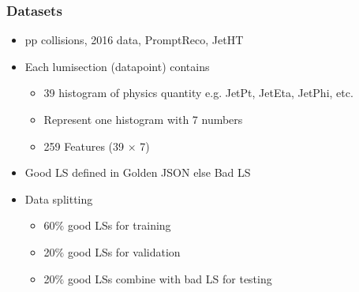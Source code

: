 \documentclass{beamer}
\begin{document}
\begin{frame}
\frametitle{Datasets}
\begin{itemize}
    \item pp collisions, 2016 data, PromptReco, JetHT
    \item Each lumisection (datapoint) contains
    \begin{itemize}
        \item 39 histogram of physics quantity e.g. JetPt, JetEta, JetPhi, etc.
        \item Represent one histogram with 7 numbers
        \item 259 Features (39 $\times$ 7)
    \end{itemize}
    \item \textcolor[RGB]{0,128,0}{Good LS} defined in Golden JSON else \textcolor[RGB]{255,0,0}{Bad LS}
    \item Data splitting
    \begin{itemize}
        \item \textcolor[RGB]{0,128,0}{60$\%$} good LSs for training
        \item \textcolor[RGB]{0,128,0}{20$\%$} good LSs for validation
        \item \textcolor[RGB]{128,0,128}{20$\%$} good LSs combine with bad LS for testing
    \end{itemize}
\end{itemize}
\end{frame}
\end{document}
